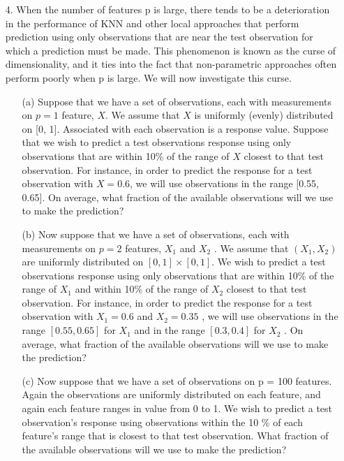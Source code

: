 \documentclass[12pt,a4paper]{article}%
\theoremstyle{definition}
\theoremstyle{plain}
\numberwithin{equation}{section}
\begin{document}
\begin{enumerate}
\item[4.]  When the number of features p is large, there tends to be a deterioration in the performance of KNN and other local approaches that perform prediction using only observations that are near the test observation for which a prediction must be made. This phenomenon is known as the curse of dimensionality, and it ties into the fact that non-parametric approaches often perform poorly when p is large. We will now investigate this curse.

\begin{enumerate}
\item[(a)] Suppose that we have a set of observations, each with measurements on $p = 1$ feature, $X$. We assume that $X$ is uniformly (evenly) distributed on [0, 1]. 
Associated with each observation is a response value. 
Suppose that we wish to predict a test observations response using only observations that are within 10\% of the range of $X$ closest to that test observation. 
For instance, in order to predict the response for a test observation with $X = 0.6$, we will use observations in the range [0.55, 0.65]. 
On average, what fraction of the available observations will we use to make the prediction?

\item[(b)] Now suppose that we have a set of observations, each with measurements on $p = 2$ features, $X_{1}$ and $X_{2}$ . We assume that
$(X_{1} , X_{2})$ are uniformly distributed on $[0, 1] \times [0, 1]$. 
We wish to predict a test observations response using only observations that are within 10\% of the range of $X_{1}$ and within 10\% of the range of $X_{2}$ closest to that test observation. 
For instance, in order to predict the response for a test observation with $X_{1} = 0.6$ and
$X_{2}=0.35$ , we will use observations in the range $[0.55, 0.65]$ for
$X_{1}$ and in the range $[0.3, 0.4]$ for $X_{2}$ . On average, what fraction of the available observations will we use to make the prediction?

\item[(c)] Now suppose that we have a set of observations on p = 100 features. 
Again the observations are uniformly distributed on each feature, and again each feature ranges in value from 0 to 1. 
We wish to predict a test observation's response using observations within the 10 \% of each feature's range that is closest to that test
observation. What fraction of the available observations will we use to make the prediction?


\end{enumerate}
\end{enumerate}
\end{document}

